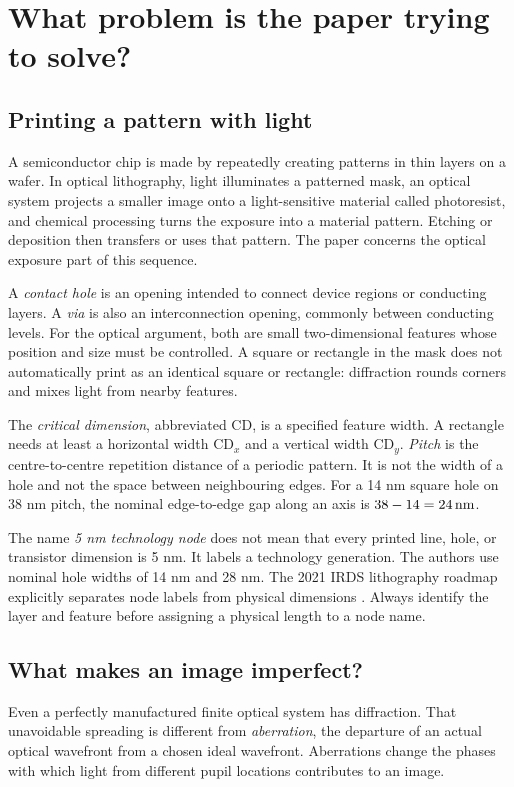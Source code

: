 \chapter{What problem is the paper trying to solve?}\label{ch:story}

\section{Printing a pattern with light}
A semiconductor chip is made by repeatedly creating patterns in thin
layers on a wafer. In optical lithography, light illuminates a patterned
mask, an optical system projects a smaller image onto a light-sensitive
material called photoresist, and chemical processing turns the exposure
into a material pattern. Etching or deposition then transfers or uses that
pattern. The paper concerns the optical exposure part of this sequence.

A \emph{contact hole} is an opening intended to connect device regions or
conducting layers. A \emph{via} is also an interconnection opening, commonly
between conducting levels. For the optical argument, both are small
two-dimensional features whose position and size must be controlled.
A square or rectangle in the mask does not automatically print as an
identical square or rectangle: diffraction rounds corners and mixes light
from nearby features.

The \emph{critical dimension}, abbreviated CD, is a specified feature width.
A rectangle needs at least a horizontal width $\mathrm{CD}_x$ and a vertical
width $\mathrm{CD}_y$. \emph{Pitch} is the centre-to-centre repetition
distance of a periodic pattern. It is not the width of a hole and not the
space between neighbouring edges. For a 14 nm square hole on 38 nm pitch,
the nominal edge-to-edge gap along an axis is $38-14=24\,\mathrm{nm}$.

The name \emph{5 nm technology node} does not mean that every printed line,
hole, or transistor dimension is 5 nm. It labels a technology generation.
The authors use nominal hole widths of 14 nm and 28 nm. The 2021 IRDS
lithography roadmap explicitly separates node labels from physical
dimensions \cite{irds}. Always identify the layer and feature before
assigning a physical length to a node name.

\section{What makes an image imperfect?}
Even a perfectly manufactured finite optical system has diffraction.
That unavoidable spreading is different from \emph{aberration}, the
departure of an actual optical wavefront from a chosen ideal wavefront.
Aberrations change the phases with which light from different pupil
locations contributes to an image.

